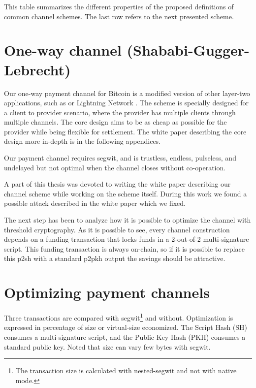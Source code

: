 This table summarizes the different properties of the proposed definitions of
common channel schemes. The last row refers to the next presented scheme.

\section{One-way channel (Shababi-Gugger-Lebrecht)}

Our one-way payment channel for Bitcoin is a modified version of other layer-two
applications, such as  or Lightning Network
\cite{poon2016bitcoin, YoursLightningProtocol}. The scheme is specially designed
for a client to provider scenario, where the provider has multiple clients
through multiple channels. The core design aims to be as cheap as possible for
the provider while being flexible for settlement. The white paper describing the
core design more in-depth is in the following appendices.

Our payment channel requires \gls{segwit}, and is trustless, endless, pulseless,
and undelayed but not optimal when the channel closes without co-operation.

A part of this thesis was devoted to writing the white paper describing our
channel scheme while working on the scheme itself. During this work we found a
possible attack described in the white paper which we fixed.

The next step has been to analyze how it is possible to optimize the channel
with threshold cryptography. As it is possible to see, every channel
construction depends on a funding transaction that locks funds in a 2-out-of-2
multi-signature script. This funding transaction is always on-chain, so if it is
possible to replace this \gls{p2sh} with a standard \gls{p2pkh} output the savings
should be attractive.

\section{Optimizing payment channels}


Three transactions are compared with \gls{segwit}\footnote{ The transaction size
is calculated with nested-\gls{segwit} and not with native mode.} and without.
Optimization is expressed in percentage of size or virtual-size economized. The
Script Hash (SH) consumes a multi-signature script, and the Public Key Hash
(PKH) consumes a standard public key. Noted that size can vary few bytes with
\gls{segwit}.

